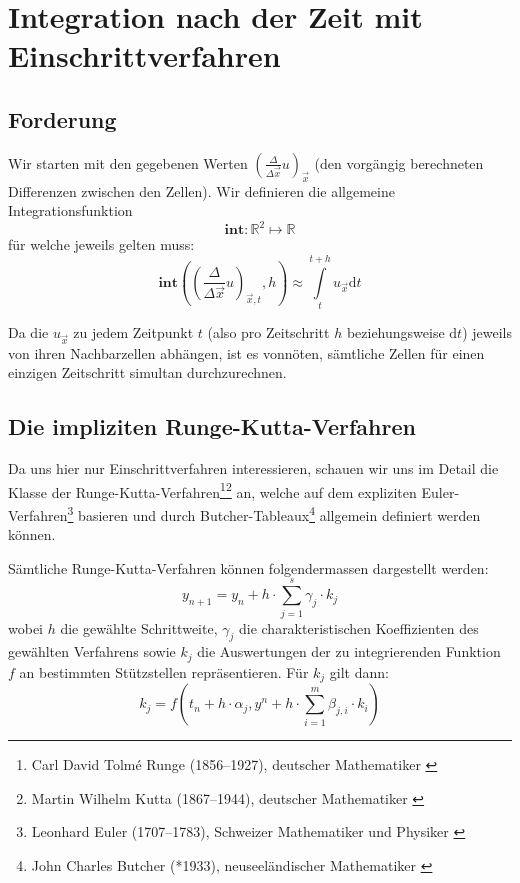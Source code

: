 \documentclass[11pt]{article} %
\theoremstyle{definition}
\begin{document}
\section{Integration nach der Zeit mit Einschrittverfahren}

\newcommand{\intr}{\mathbf{int}}
\renewcommand{\d}{\mathrm{d}}
\newcommand{\duxt}{\left(\frac{\Delta}{\Delta \vec x}u \right)_{\vec x, t}}

\subsection{Forderung}

Wir starten mit den gegebenen Werten $\left(\frac{\Delta}{\Delta \vec x}u \right)_{\vec x}$ (den vorgängig berechneten Differenzen zwischen den Zellen). Wir definieren die allgemeine Integrationsfunktion
\[
\intr :  \mathbb{R}^2 \mapsto \mathbb{R}
\]
für welche jeweils gelten muss:
\[
\intr\left(\duxt, h \right) \approx \int\limits_t^{t+h} u_{\vec x} \d t
\]

Da die $u_{\vec x}$ zu jedem Zeitpunkt $t$ (also pro Zeitschritt $h$ beziehungsweise $\d t$) jeweils von ihren Nachbarzellen abhängen, ist es vonnöten, sämtliche Zellen für einen einzigen Zeitschritt simultan durchzurechnen.

\subsection{Die impliziten Runge-Kutta-Verfahren}

Da uns hier nur Einschrittverfahren interessieren, schauen wir uns im Detail die Klasse der Runge-Kutta-Verfahren\footnote{Carl David Tolmé Runge (1856--1927), deutscher Mathematiker \cite{wiki:Runge}}\footnote{Martin Wilhelm Kutta (1867--1944), deutscher Mathematiker \cite{wiki:Kutta}} an, welche auf dem expliziten Euler-Verfahren\footnote{Leonhard Euler (1707--1783), Schweizer Mathematiker und Physiker \cite{wiki:Euler}} basieren und durch Butcher-Tableaux\footnote{John Charles Butcher (*1933), neuseeländischer Mathematiker \cite{wiki:Butcher}} allgemein definiert werden können.

Sämtliche Runge-Kutta-Verfahren können folgendermassen dargestellt werden:
\[
y_{n+1} = y_n + h\cdot \sum\limits_{j=1}^s \gamma_j \cdot k_j
\]
wobei $h$ die gewählte Schrittweite, $\gamma_j$ die charakteristischen Koeffizienten des gewählten Verfahrens sowie $k_j$ die Auswertungen der zu integrierenden Funktion $f$ an bestimmten Stützstellen repräsentieren. Für $k_j$ gilt dann:
\[
k_j = f\left(t_n + h\cdot\alpha_j, y^n + h\cdot \sum\limits_{i=1}^m \beta_{j,i}\cdot k_i \right)
\]
\end{document}
